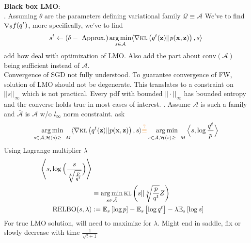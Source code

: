     {\bf Black box LMO}: \\
    . Assuming 
    $\theta$ are the parameters defining variational family $\mathcal{Q} \equiv \mathcal{A}$
    We've to find $\nabla_{\theta}f(q^t)$, more specifically, we've to find 
    $$
    s^t \gets (\delta-\text{ Approx.}) \operatorname*{arg\,min}\limits_{s \in \mathcal{A}}\langle 
    \nabla \textsc{kl}\left(q^t(\mathbf{z}) || p(\mathbf{x}, \mathbf{z})\right), s \rangle
    $$
    \TODO add how \cite{guo2016boosting} \cite{locatello2017boosting} deal with optimization of LMO. Also
    add the part about $\text{conv}(\mathcal{A})$ being sufficient instead of $\mathcal{A}$.\\
    Convergence of SGD not fully understood. To guarantee convergence of FW, solution of LMO should 
    not be degenerate. This translates to a constraint on $||s||_{\infty}$ which is not practical.
    Every pdf with bounded $||\cdot||_{\infty}$ has bounded entropy and the converse holds true in 
    most cases of interest. . Assume $\mathcal{A}$ is such a family
    and $\bar{\mathcal{A}}$ is $\mathcal{A}$ w/o $l_{\infty}$ norm constraint.  \TODO ask
    $$
    \argmin\limits_{s \in \bar{\mathcal{A}}, \mathcal{H}(s) \geq -M}\langle \grad 
    \kl{q^t(\bz) || p(\bx, \bz)},
    s \rangle \orange{\overset{?}{\equiv}}
    \argmin\limits_{s \in \bar{\mathcal{A}}, \mathcal{H}(s) \geq -M}\Big\langle s, 
    \log \frac{q^t}{p} \Big\rangle
    $$
    Using Lagrange multiplier $\lambda$
    \begin{align}
      \Bigg\langle s, \log \Big(\frac{s}{\sqrt[\lambda]{\frac{p}{q^t}}} \Big)\Bigg\rangle \nonumber\\
    &\equiv \operatorname*{arg\,min}\limits_{s \in \bar{\mathcal{A}}}\textsc{kl}\left(s||{\sqrt[\lambda]{\frac{p}{q^t}}} Z\right) \nonumber\\
      \text{RELBO}(s, \lambda) &:= \mathbb{E}_{s}\left[\log p\right] - \mathbb{E}_{s}\left[\log q^t\right] - \lambda\mathbb{E}_{s}\left[\log s\right]
    \end{align}
    For true LMO solution, will need to maximize for $\lambda$. Might end in saddle, fix or slowly decrease
    with time $\frac{1}{\sqrt{t + 1}}$


